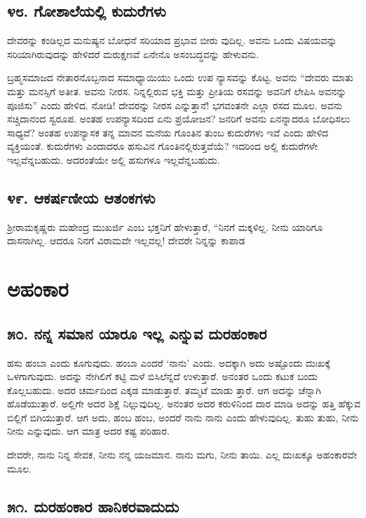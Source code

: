 \section{\num{೪೮. } ಗೋಶಾಲೆಯಲ್ಲಿ ಕುದುರೆಗಳು}

ದೇವರನ್ನು ಕಂಡಿಲ್ಲದ ಮನುಷ್ಯನ ಬೋಧನೆ ಸರಿಯಾದ ಪ್ರಭಾವ ಬೀರು ವುದಿಲ್ಲ. ಅವನು ಒಂದು ವಿಷಯವನ್ನು ಸರಿಯಾಗಿರುವುದನ್ನು ಹೇಳಿದರೆ ಮರುಕ್ಷಣವೆ ಏನೇನೊ ಅಸಂಬದ್ಧವನ್ನು ಹೇಳುವನು.

ಬ್ರಹ್ಮಸಮಾಜದ ನೇತಾರನೊಬ್ಬನಾದ ಸಮಾಧ್ಯಾಯಿಯು ಒಂದು ಉಪ ನ್ಯಾಸವನ್ನು ಕೊಟ್ಟ. ಅವನು “ದೇವರು ಮಾತು ಮತ್ತು ಮನಸ್ಸಿಗೆ ಅತೀತ. ಅವನು ನೀರಸ. ನಿನ್ನಲ್ಲಿರುವ ಭಕ್ತಿ ಮತ್ತು ಪ್ರೀತಿಯ ರಸವನ್ನು ಅವನಿಗೆ ಲೇಪಿಸಿ ಅವನನ್ನು ಪೂಜಿಸು” ಎಂದು ಹೇಳಿದ. ನೋಡಿ! ದೇವರನ್ನು ನೀರಸ ಎನ್ನುತ್ತಾನೆ! ಭಗವಂತನೇ ಎಲ್ಲಾ ರಸದ ಮೂಲ. ಅವನು ಸಚ್ಚಿದಾನಂದ ಸ್ವರೂಪ. ಅಂತಹ ಉಪನ್ಯಾಸದಿಂದ ಏನು ಪ್ರಯೋಜನ? ಜನರಿಗೆ ಅವನು ಏನನ್ನಾದರೂ ಬೋಧಿಸಲು ಸಾಧ್ಯವೆ? ಅಂತಹ ಉಪನ್ಯಾಸಕ ತನ್ನ ಮಾವನ ಮನೆಯ ಗೊಂತಿನ ತುಂಬ ಕುದುರೆಗಳು ಇವೆ ಎಂದು ಹೇಳಿದ ವ್ಯಕ್ತಿಯಂತೆ. ಕುದುರೆಗಳು ಎಂದಾದರೂ ಹಸುವಿನ ಗೊಂತಿನಲ್ಲಿರುತ್ತವೆಯೆ? ಇದರಿಂದ ಅಲ್ಲಿ ಕುದುರೆಗಳೇ ಇಲ್ಲವೆನ್ನಬಹುದು. ಅದರಂತೆಯೇ ಅಲ್ಲಿ ಹಸುಗಳೂ ಇಲ್ಲವೆನ್ನಬಹುದು.


\section{\num{೪೯. } ಆಕರ್ಷಣೀಯ ಆತಂಕಗಳು}

ಶ್ರೀರಾಮಕೃಷ್ಣರು ಮಹೇಂದ್ರ ಮುಖರ್ಜಿ ಎಂಬ ಭಕ್ತನಿಗೆ ಹೇಳುತ್ತಾರೆ, “ನಿನಗೆ ಮಕ್ಕಳಿಲ್ಲ. ನೀನು ಯಾರಿಗೂ ದಾಸನಾಗಿಲ್ಲ. ಆದರೂ ನಿನಗೆ ವಿರಾಮವೇ ಇಲ್ಲವಲ್ಲ! ದೇವರೇ ನಿನ್ನನ್ನು ಕಾಪಾಡ


\chapter{ಅಹಂಕಾರ}

\section{\num{೫೦. } ನನ್ನ ಸಮಾನ ಯಾರೂ ಇಲ್ಲ ಎನ್ನುವ ದುರಹಂಕಾರ}

ಹಸು ಹಂಬಾ ಎಂದು ಕೂಗುವುದು. ಹಂಬಾ ಎಂದರೆ ‘ನಾನು’ ಎಂದು. ಅದಕ್ಕಾಗಿ ಅದು ಅಷ್ಟೊಂದು ದುಃಖಕ್ಕೆ ಒಳಗಾಗುವುದು. ಅದನ್ನು ನೇಗಿಲಿಗೆ ಕಟ್ಟಿ ಮಳೆ ಬಿಸಿಲೆನ್ನದೆ ಉಳುತ್ತಾರೆ. ಅನಂತರ ಒಂದು ಕಟುಕ ಬಂದು ಕೊಲ್ಲಬಹುದು. ಅದರ ಚರ್ಮದಿಂದ ಎಕ್ಕಡ ಮಾಡುತ್ತಾರೆ. ತಮ್ಮಟೆ ಮಾಡು ತ್ತಾರೆ. ಆಗ ಅದನ್ನು ಚೆನ್ನಾಗಿ ಹೊಡೆಯುತ್ತಾರೆ. ಅಲ್ಲಿಗೇ ಅದರ ಶಿಕ್ಷೆ ನಿಲ್ಲುವುದಿಲ್ಲ. ಅನಂತರ ಅದರ ಕರುಳಿನಿಂದ ದಾರ ಮಾಡಿ ಅದನ್ನು ಹತ್ತಿ ಹೆಕ್ಕುವ ಬಿಲ್ಲಿಗೆ ಬಿಗಿಯುತ್ತಾರೆ. ಆಗ ಅದು, ಹಂಬ ಹಂಬ, ಅಂದರೆ ನಾನು ನಾನು ಎಂದು ಹೇಳುವುದಿಲ್ಲ. ತುಹು ತುಹು, ನೀನು ನೀನು ಎನ್ನುವುದು. ಆಗ ಮಾತ್ರ ಅದರ ಕಷ್ಟ ಪರಿಹಾರ.

ದೇವರೇ, ನಾನು ನಿನ್ನ ಸೇವಕ, ನೀನು ನನ್ನ ಯಜಮಾನ. ನಾನು ಮಗು, ನೀನು ತಾಯಿ. ಎಲ್ಲ ದುಃಖಕ್ಕೂ ಅಹಂಕಾರವೇ ಮೂಲ.


\section{\num{೫೧. } ದುರಹಂಕಾರ ಹಾನಿಕರವಾದುದು}


